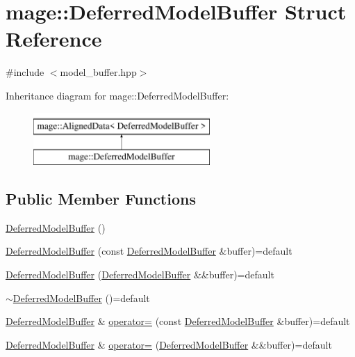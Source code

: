 \hypertarget{structmage_1_1_deferred_model_buffer}{}\section{mage\+:\+:Deferred\+Model\+Buffer Struct Reference}
\label{structmage_1_1_deferred_model_buffer}


{\ttfamily \#include $<$model\+\_\+buffer.\+hpp$>$}

Inheritance diagram for mage\+:\+:Deferred\+Model\+Buffer\+:\begin{figure}[H]
\begin{center}
\leavevmode
\includegraphics[height=2.000000cm]{structmage_1_1_deferred_model_buffer}
\end{center}
\end{figure}
\subsection*{Public Member Functions}
\begin{DoxyCompactItemize}
\item 
\hyperlink{structmage_1_1_deferred_model_buffer_a34fee5aa2eb71c488c50c36bb5c90700}{Deferred\+Model\+Buffer} ()
\item 
\hyperlink{structmage_1_1_deferred_model_buffer_ae90c52678b98c25e2ff966f0b4d79663}{Deferred\+Model\+Buffer} (const \hyperlink{structmage_1_1_deferred_model_buffer}{Deferred\+Model\+Buffer} \&buffer)=default
\item 
\hyperlink{structmage_1_1_deferred_model_buffer_a0545918fe84e92af3d444039845dad63}{Deferred\+Model\+Buffer} (\hyperlink{structmage_1_1_deferred_model_buffer}{Deferred\+Model\+Buffer} \&\&buffer)=default
\item 
\hyperlink{structmage_1_1_deferred_model_buffer_a94a9fe29f0abeaa0583b98de71902897}{$\sim$\+Deferred\+Model\+Buffer} ()=default
\item 
\hyperlink{structmage_1_1_deferred_model_buffer}{Deferred\+Model\+Buffer} \& \hyperlink{structmage_1_1_deferred_model_buffer_aaaa9056b22ab42b65273406c6b85e0a2}{operator=} (const \hyperlink{structmage_1_1_deferred_model_buffer}{Deferred\+Model\+Buffer} \&buffer)=default
\item 
\hyperlink{structmage_1_1_deferred_model_buffer}{Deferred\+Model\+Buffer} \& \hyperlink{structmage_1_1_deferred_model_buffer_aa5bc6dff6a80b1f1ea8b5d8d5db1ef75}{operator=} (\hyperlink{structmage_1_1_deferred_model_buffer}{Deferred\+Model\+Buffer} \&\&buffer)=default
\end{DoxyCompactItemize}
